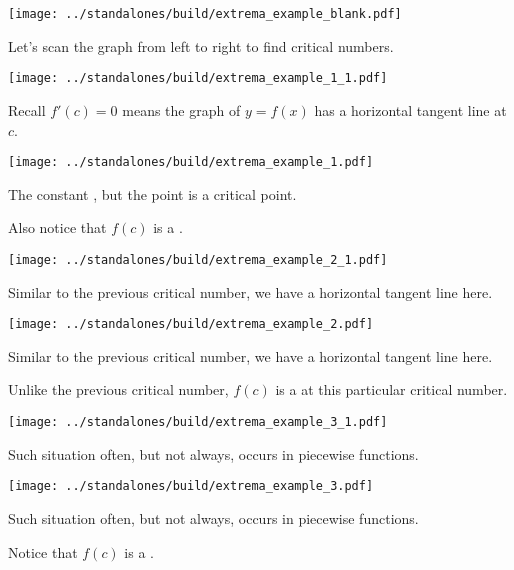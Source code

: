 \documentclass[12pt]{beamer}
\begin{document}
 
\begin{frame}[t]
  \texttt{[image: ../standalones/build/extrema\_example\_blank.pdf]}

  Let's scan the graph from left to right to find critical numbers.
\end{frame}

\begin{frame}[t]
  \texttt{[image: ../standalones/build/extrema\_example\_1\_1.pdf]}

  Recall \(f'(c) = 0\) means the graph of \(y = f(x)\) has a horizontal tangent line at \(c\).
\end{frame}

\begin{frame}[t]
  \texttt{[image: ../standalones/build/extrema\_example\_1.pdf]}
  
  \pause
  The constant , but the point  is a critical point.

  Also notice that \(f(c)\) is a .
\end{frame}

\begin{frame}[t]
  \texttt{[image: ../standalones/build/extrema\_example\_2\_1.pdf]}

  Similar to the previous critical number, we have a horizontal tangent line here.
\end{frame}

\begin{frame}[t]
  \texttt{[image: ../standalones/build/extrema\_example\_2.pdf]}
  
  Similar to the previous critical number, we have a horizontal tangent line here.
  \pause

  Unlike the previous critical number, \(f(c)\) is a  at this particular critical number.
\end{frame}


\begin{frame}[t]
  \texttt{[image: ../standalones/build/extrema\_example\_3\_1.pdf]}

  Such situation often, but not always, occurs in piecewise functions.
\end{frame}

\begin{frame}[t]
  \texttt{[image: ../standalones/build/extrema\_example\_3.pdf]}
  
  Such situation often, but not always, occurs in piecewise functions.

  \pause 
  Notice that \(f(c)\) is a .
\end{frame}
\end{document}
